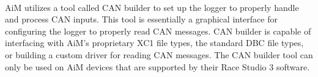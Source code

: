 \paragraph{}
AiM utilizes a tool called CAN builder to set up the logger to properly handle and process CAN inputs.
This tool is essentially a graphical interface for configuring the logger to properly read CAN messages.
CAN builder is capable of interfacing with AiM's proprietary XC1 file types, the standard DBC file types, or building a custom driver for reading CAN messages.
The CAN builder tool can only be used on AiM devices that are supported by their Race Studio 3 software.